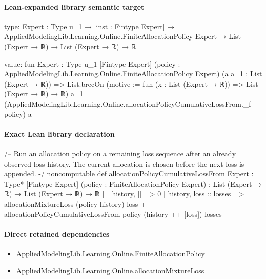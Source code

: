 \documentclass[10pt]{article}
\begin{document}
\paragraph{Lean-expanded library semantic target}
\begin{ReviewVerbatim}
type:
{Expert : Type u_1} →
  [inst : Fintype Expert] →
    AppliedModelingLib.Learning.Online.FiniteAllocationPolicy Expert → List (Expert → ℝ) → List (Expert → ℝ) → ℝ

value:
fun {Expert : Type u_1} [Fintype Expert] (policy : AppliedModelingLib.Learning.Online.FiniteAllocationPolicy Expert)
    (a a_1 : List (Expert → ℝ)) =>
  List.brecOn (motive := fun (x : List (Expert → ℝ)) => List (Expert → ℝ) → ℝ) a_1
    (AppliedModelingLib.Learning.Online.allocationPolicyCumulativeLossFrom._f policy) a
\end{ReviewVerbatim}

\paragraph{Exact Lean library declaration}
\begin{ReviewVerbatim}
/--
Run an allocation policy on a remaining loss sequence after an already observed
loss history. The current allocation is chosen before the next loss is appended.
-/
noncomputable def allocationPolicyCumulativeLossFrom
    {Expert : Type*} [Fintype Expert] (policy : FiniteAllocationPolicy Expert) :
    List (Expert → ℝ) → List (Expert → ℝ) → ℝ
  | _history, [] => 0
  | history, loss :: losses =>
      allocationMixtureLoss (policy history) loss +
        allocationPolicyCumulativeLossFrom policy (history ++ [loss]) losses
\end{ReviewVerbatim}

\paragraph{Direct retained dependencies}
\begin{itemize}\raggedright
\item \hyperlink{governing-declaration-35a496d3f7266dae}{Applied\allowbreak{}Modeling\allowbreak{}Lib.\allowbreak{}Learning.\allowbreak{}Online.\allowbreak{}Finite\allowbreak{}Allocation\allowbreak{}Policy}
\item \hyperlink{governing-declaration-393ac140e5bdf572}{Applied\allowbreak{}Modeling\allowbreak{}Lib.\allowbreak{}Learning.\allowbreak{}Online.\allowbreak{}allocation\allowbreak{}Mixture\allowbreak{}Loss}
\end{itemize}
\end{document}
